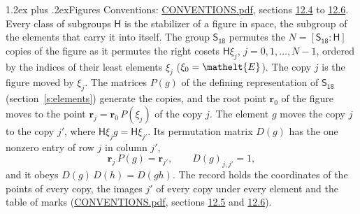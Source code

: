 \documentclass[10pt,a4paper]{article}
\makeatletter
\renewcommand\section{\@startsection{section}{1}{\z@}{-3ex plus -1ex minus -.2ex}%
  {1.2ex plus .2ex}{\normalfont\large\sffamily\bfseries\color{parttitle}}}
\numberwithin{equation}{section}
\newcommand{\eltfont}[1]{{\let\sigma\eltsigma\mathelt{#1}}}
\newcommand{\grp}[1]{\mathsf{#1}}
\newcommand{\cls}[1]{\eltfont{#1}}
\newcommand{\pointr}{\mathbf{r}}
\makeatother
\begin{document}
\section{Figures}\label{s:permutation}
Conventions: \href{../../CONVENTIONS.pdf}{CONVENTIONS.pdf}, sections \href{../../CONVENTIONS.pdf\#conv.12.4}{12.4} to \href{../../CONVENTIONS.pdf\#conv.12.6}{12.6}.
Every class of subgroups $\grp{H}$ is the stabilizer of a figure in space, the subgroup of the elements that carry it into itself. \label{n:local.orbit.size}\label{n:element.coset.least}\label{n:index.coset}The group $\grp{S_{18}}$ permutes the $N = [\grp{S_{18}} : \grp{H}]$ copies of the figure as it permutes the right cosets $\grp{H}\xi_j$, $j = 0, 1, \dots, N - 1$, ordered by the indices of their least elements $\xi_j$ ($\xi_0 = \cls{E}$). The copy $j$ is the figure moved by $\xi_j$. The matrices $P(g)$ of the defining representation of $\grp{S_{18}}$ (section~\ref{s:elements}) generate the copies, and the root point $\pointr_0$ of the figure moves to the point $\pointr_j = \pointr_0\, P(\xi_j)$ of the copy $j$. \label{n:local.coset.image}The element $g$ moves the copy $j$ to the copy $j'$, where $\grp{H}\xi_j g = \grp{H}\xi_{j'}$. \label{n:local.matrix.permutation}Its permutation matrix $D(g)$ has the one nonzero entry of row $j$ in column $j'$,
\begin{equation}\label{e:perm.matrix}\pointr_j\, P(g) = \pointr_{j'}, \qquad D(g)_{j,j'} = 1,\end{equation}
and it obeys $D(g)\, D(h) = D(gh)$. The record holds the coordinates of the points of every copy, the images $j'$ of every copy under every element and the table of marks (\href{../../CONVENTIONS.pdf}{CONVENTIONS.pdf}, sections \href{../../CONVENTIONS.pdf\#conv.12.5}{12.5} and \href{../../CONVENTIONS.pdf\#conv.12.6}{12.6}).
\end{document}
